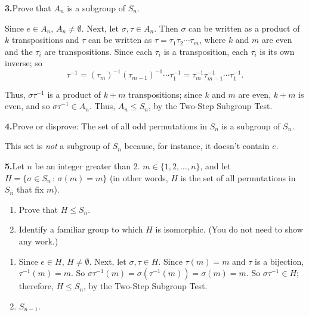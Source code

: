 \documentclass[10pt,]{book}
\theoremstyle{plain}
\theoremstyle{definition}
\theoremstyle{definition}
\theoremstyle{definition}
\theoremstyle{definition}
\numberwithin{equation}{section}
\begin{document}
\par\smallskip
\noindent\textbf{3.}\quad{}Prove that \(A_n\) is a subgroup of \(S_n\).%
\par\smallskip
Since \(e\in A_n\), \(A_n\neq \emptyset\). Next, let \(\sigma, \tau \in A_n\). Then \(\sigma\) can be written as a product of \(k\) transpositions and \(\tau\) can be written as \(\tau=\tau_1\tau_2\cdots \tau_m\), where \(k\) and \(m\) are even and the \(\tau_i\) are transpositions. Since each \(\tau_i\) is a transposition, each \(\tau_i\) is its own inverse; so%
\begin{equation*}
\tau^{-1}=(\tau_m)^{-1}(\tau_{m-1})^{-1}\cdots \tau_1^{-1}=\tau_m^{-1}\tau_{m-1}^{-1}\cdots \tau_1^{-1}.
\end{equation*}
%
\par
Thus, \(\sigma \tau^{-1}\) is a product of \(k+m\) transpositions; since \(k\) and \(m\) are even, \(k+m\) is even, and so \(\sigma \tau^{-1}\in A_n\). Thus, \(A_n\leq S_n\), by the Two-Step Subgroup Test.%
\par\smallskip
\noindent\textbf{4.}\quad{}Prove or disprove: The set of all odd permutations in \(S_n\) is a subgroup of \(S_n\).%
\par\smallskip
This set is \emph{not} a subgroup of \(S_n\) because, for instance, it doesn't contain \(e\).%
\par\smallskip
\noindent\textbf{5.}\quad{}Let \(n\) be an integer greater than 2. \(m \in \{1,2,\ldots,n\}\), and let \(H=\{\sigma\in S_n\,:\,\sigma(m)=m\}\) (in other words, \(H\) is the set of all permutations in \(S_n\) that fix \(m\)). \leavevmode%
\begin{enumerate}[label=(\alph*)]
\item\hypertarget{li-367}{}Prove that \(H\leq S_n\).%
\item\hypertarget{li-368}{}Identify a familiar group to which \(H\) is isomorphic. (You do not need to show any work.)%
\end{enumerate}
%
\par\smallskip
\leavevmode%
\begin{enumerate}[label=(\alph*)]
\item\hypertarget{li-369}{}Since \(e\in H\), \(H\neq \emptyset\).  Next, let \(\sigma, \tau\in H\).  Since \(\tau(m)=m\) and \(\tau\) is a bijection, \(\tau^{-1}(m)=m\).  So \(\sigma \tau^{-1}(m)=\sigma(\tau^{-1}(m))=\sigma(m)=m\).  So \(\sigma \tau^{-1}\in H\); therefore, \(H\leq S_n\), by the Two-Step Subgroup Test.%
\item\hypertarget{li-370}{}\(S_{n-1}\).%
\end{enumerate}
\end{document}
